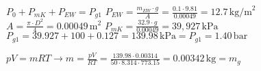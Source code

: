 \( P_0 + P_{mK} + P_{EW} = P_{g1} \)  
\( P_{EW} = \frac{m_{EW} \cdot g}{A} = \frac{0.1 \cdot 9.81}{0.00049} = 12.7 \, \text{kg/m}^2 \)  
\( A = \frac{\pi \cdot D^2}{4} = 0.00049 \, \text{m}^2 \)  
\( P_{mK} = \frac{32.9 \cdot g}{0.00049} = 39,927 \, \text{kPa} \)  
\( P_{g1} = 39.927 + 100 + 0.127 = 139.98 \, \text{kPa} = P_{g1} = 1.40 \, \text{bar} \)  

\( pV = mRT \rightarrow m = \frac{pV}{RT} = \frac{139.98 \cdot 0.00314}{50 \cdot 8.314 \cdot 773.15} = 0.00342 \, \text{kg} = m_g \)